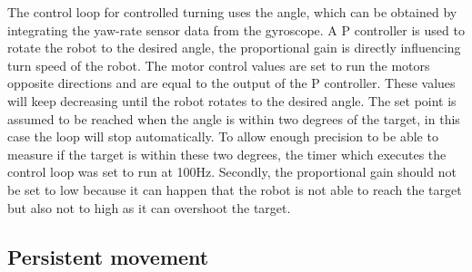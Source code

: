 The control loop for controlled turning uses the angle, which can be obtained by integrating the yaw-rate sensor data from the gyroscope.
A P controller is used to rotate the robot to the desired angle, the proportional gain is directly influencing turn speed of the robot.
The motor control values are set to run the motors opposite directions and are equal to the output of the P controller.
These values will keep decreasing until the robot rotates to the desired angle.
The set point is assumed to be reached when the angle is within two degrees of the target, in this case the loop will stop automatically.
To allow enough precision to be able to measure if the target is within these two degrees, the timer which executes the control loop was set to run at 100Hz.
Secondly, the proportional gain should not be set to low because it can happen that the robot is not able to reach the target but also not to high as it can overshoot the target.

\subsection{Persistent movement}


